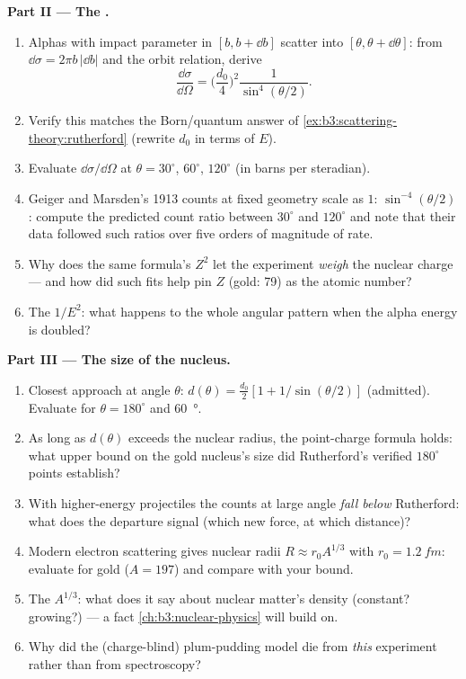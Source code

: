 \begin{problem}
\medskip\noindent\textbf{Part II --- The .}
\begin{enumerate}[resume]
  \item Alphas with impact parameter in $[b, b + \dd b]$ scatter
        into $[\theta, \theta + \dd\theta]$: from $\dd\sigma =
        2\pi b\,|\dd b|$ and the orbit relation, derive
        \[
        \frac{\dd\sigma}{\dd\Omega} =
        \Big(\frac{d_0}{4}\Big)^2\frac{1}{\sin^4(\theta/2)} .
        \]
  \item Verify this matches the Born/quantum answer of
        \cref{ex:b3:scattering-theory:rutherford} (rewrite $d_0$
        in terms of $E$).
  \item Evaluate $\dd\sigma/\dd\Omega$ at $\theta = 30^\circ$,
        $60^\circ$, $120^\circ$ (in barns per steradian).
  \item Geiger and Marsden's 1913 counts at fixed geometry scale
        as $1{:}\,\sin^{-4}(\theta/2)$: compute the predicted
        count ratio between $30^\circ$ and $120^\circ$ and
        note that
        their data followed such ratios over five orders of
        magnitude of rate.
  \item Why does the same formula's $Z^2$ let the experiment
        \emph{weigh} the nuclear charge --- and how did such fits
        help pin $Z$ (gold: 79) as the atomic number?
  \item The $1/E^2$: what happens to the whole angular pattern
        when the alpha energy is doubled?
\end{enumerate}

\medskip\noindent\textbf{Part III --- The size of the nucleus.}
\begin{enumerate}[resume]
  \item Closest approach at angle $\theta$: $d(\theta) =
        \tfrac{d_0}2[1 + 1/\sin(\theta/2)]$ (admitted). Evaluate
        for $\theta = 180^\circ$ and \qty{60}{\degree}.
  \item As long as $d(\theta)$ exceeds the nuclear radius, the
        point-charge formula holds: what upper bound on the gold
        nucleus's size did Rutherford's verified $180^\circ$
        points establish?
  \item With higher-energy projectiles the counts at large angle
        \emph{fall below} Rutherford: what does the departure
        signal (which new force, at which distance)?
  \item Modern electron scattering gives nuclear radii $R
        \approx r_0A^{1/3}$ with $r_0 = \qty{1.2}{fm}$: evaluate
        for gold ($A = 197$) and compare with your bound.
  \item The $A^{1/3}$: what does it say about nuclear matter's
        density (constant? growing?) --- a fact
        \cref{ch:b3:nuclear-physics} will build on.
  \item Why did the (charge-blind) plum-pudding model die from
        \emph{this} experiment rather than from spectroscopy?
\end{enumerate}


\end{problem}
